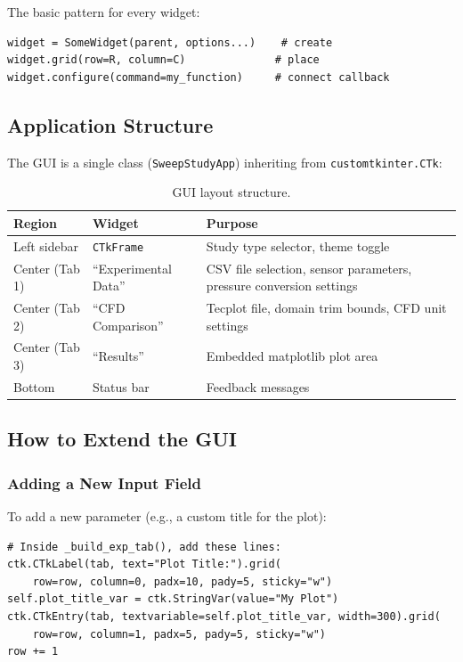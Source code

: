 \documentclass[11pt, letterpaper]{article}
\begin{document}
The basic pattern for every widget:
\begin{lstlisting}[numbers=none]
widget = SomeWidget(parent, options...)    # create
widget.grid(row=R, column=C)              # place
widget.configure(command=my_function)     # connect callback
\end{lstlisting}

\subsection{Application Structure}

The GUI is a single class (\texttt{SweepStudyApp}) inheriting from
\texttt{customtkinter.CTk}:

\begin{table}[h!]
\centering
\caption{GUI layout structure.}
\begin{tabular}{@{}llp{7cm}@{}}
\toprule
\textbf{Region} & \textbf{Widget} & \textbf{Purpose} \\
\midrule
Left sidebar     & \texttt{CTkFrame}    & Study type selector, theme toggle \\
Center (Tab 1)   & ``Experimental Data'' & CSV file selection, sensor parameters, pressure conversion settings \\
Center (Tab 2)   & ``CFD Comparison''    & Tecplot file, domain trim bounds, CFD unit settings \\
Center (Tab 3)   & ``Results''           & Embedded matplotlib plot area \\
Bottom           & Status bar            & Feedback messages \\
\bottomrule
\end{tabular}
\end{table}

\subsection{How to Extend the GUI}

\subsubsection*{Adding a New Input Field}

To add a new parameter (e.g., a custom title for the plot):

\begin{lstlisting}[caption={Adding a new text entry to a tab.}]
# Inside _build_exp_tab(), add these lines:
ctk.CTkLabel(tab, text="Plot Title:").grid(
    row=row, column=0, padx=10, pady=5, sticky="w")
self.plot_title_var = ctk.StringVar(value="My Plot")
ctk.CTkEntry(tab, textvariable=self.plot_title_var, width=300).grid(
    row=row, column=1, padx=5, pady=5, sticky="w")
row += 1
\end{lstlisting}
\end{document}
